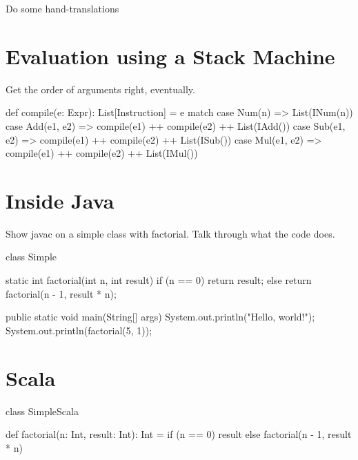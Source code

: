 \documentclass{book}
\begin{document}
Do some hand-translations

\section{Evaluation using a Stack Machine}

Get the order of arguments right, eventually.

\begin{scalacode}
def compile(e: Expr): List[Instruction] = e match {
  case Num(n) => List(INum(n))
  case Add(e1, e2) => compile(e1) ++ compile(e2) ++ List(IAdd())
  case Sub(e1, e2) => compile(e1) ++ compile(e2) ++ List(ISub())
  case Mul(e1, e2) => compile(e1) ++ compile(e2) ++ List(IMul())
}

\end{scalacode}

\section{Inside Java}

Show javac on a simple class with factorial. Talk through what the code does.

\begin{javacode}
class Simple {

  static int factorial(int n, int result) {
    if (n == 0) {
      return result;
    }
    else {
      return factorial(n - 1, result * n);
    }
  }

  public static void main(String[] args) {
    System.out.println("Hello, world!");
     System.out.println(factorial(5, 1));
  }

}
\end{javacode}


\section{Scala}

\begin{scalacode}
class SimpleScala {

  def factorial(n: Int, result: Int): Int = {
    if (n == 0) {
      result
    }
    else {
      factorial(n - 1, result * n)
    }
  }

}
\end{scalacode}
\end{document}
